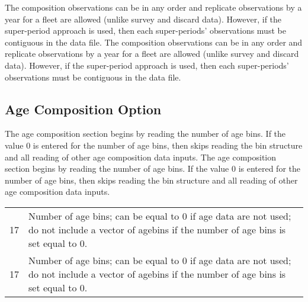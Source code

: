 The composition observations can be in any order and replicate observations by a year for a fleet are allowed (unlike survey and discard data). However, if the super-period approach is used, then each super-periods' observations must be contiguous in the data file.
The composition observations can be in any order and replicate observations by a year for a fleet are allowed (unlike survey and discard data). However, if the super-period approach is used, then each super-periods' observations must be contiguous in the data file.

\subsection{Age Composition Option}
The age composition section begins by reading the number of age bins. If the value 0 is entered for the number of age bins, then skips reading the bin structure and all reading of other age composition data inputs.
The age composition section begins by reading the number of age bins. If the value 0 is entered for the number of age bins, then skips reading the bin structure and all reading of other age composition data inputs.
\begin{center}
	\vspace*{-\baselineskip}
	\vspace*{-\baselineskip}
	\begin{tabular}{p{3cm} p{13cm}}
		\hline
		17 \Tstrut & Number of age bins; can be equal to 0 if age data are not used; do not include a vector of agebins if the number of age bins is set equal to 0. \Bstrut\\
		17 \Tstrut & Number of age bins; can be equal to 0 if age data are not used; do not include a vector of agebins if the number of age bins is set equal to 0. \Bstrut\\
		\hline
	\end{tabular}
\end{center}


